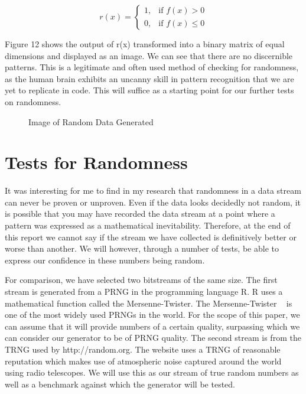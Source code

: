 \documentclass[jou,apacite]{apa6}
\begin{document}
\begin{equation}
r(x) = 
  \begin{cases}
  1, & \text{if } f(x) > 0 \\
  0, & \text{if } f(x) \leqslant 0
  \end{cases}
\end{equation}

Figure 12 shows the output of r(x) transformed into a binary matrix of equal dimensions and displayed as an image. We can see that there are no discernible patterns. This is a legitimate and often used method of checking for randomness, as the human brain exhibits an uncanny skill in pattern recognition that we are yet to replicate in code. This will suffice as a starting point for our further tests on randomness.

\begin{figure}[H]
\caption{Image of Random Data Generated}
\end{figure}

\section{Tests for Randomness}

It was interesting for me to find in my research that randomness in a data stream can never be proven or unproven. Even if the data looks decidedly not random, it is possible that you may have recorded the data stream at a point where a pattern was expressed as a mathematical inevitability. Therefore, at the end of this report we cannot say if the stream we have collected is definitively better or worse than another. We will however, through a number of tests, be able to express our confidence in these numbers being random.

For comparison, we have selected two bitstreams of the same size. The first stream is generated from a PRNG in the programming language R. R uses a mathematical function called the Mersenne-Twister. The Mersenne-Twister ~\cite{mako} is one of the most widely used PRNGs in the world. For the scope of this paper, we can assume that it will provide numbers of a certain quality, surpassing which we can consider our generator to be of PRNG quality. The second stream is from the TRNG used by http://random.org. The website uses a TRNG of reasonable reputation which makes use of atmospheric noise captured around the world using radio telescopes. We will use this as our stream of true random numbers as well as a benchmark against which the generator will be tested.
\end{document}
